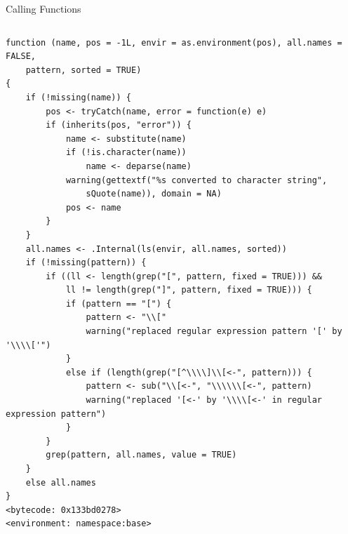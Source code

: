 \documentclass[
  11pt,
  ignorenonframetext,
]{beamer}
\begin{document}
\begin{frame}[fragile]{Calling Functions}
\begin{columns}[T,onlytextwidth]
\begin{column}{0.48\textwidth}
\begin{verbatim}
function (name, pos = -1L, envir = as.environment(pos), all.names = FALSE, 
    pattern, sorted = TRUE) 
{
    if (!missing(name)) {
        pos <- tryCatch(name, error = function(e) e)
        if (inherits(pos, "error")) {
            name <- substitute(name)
            if (!is.character(name)) 
                name <- deparse(name)
            warning(gettextf("%s converted to character string", 
                sQuote(name)), domain = NA)
            pos <- name
        }
    }
    all.names <- .Internal(ls(envir, all.names, sorted))
    if (!missing(pattern)) {
        if ((ll <- length(grep("[", pattern, fixed = TRUE))) && 
            ll != length(grep("]", pattern, fixed = TRUE))) {
            if (pattern == "[") {
                pattern <- "\\["
                warning("replaced regular expression pattern '[' by  '\\\\['")
            }
            else if (length(grep("[^\\\\]\\[<-", pattern))) {
                pattern <- sub("\\[<-", "\\\\\\[<-", pattern)
                warning("replaced '[<-' by '\\\\[<-' in regular expression pattern")
            }
        }
        grep(pattern, all.names, value = TRUE)
    }
    else all.names
}
<bytecode: 0x133bd0278>
<environment: namespace:base>
\end{verbatim}
\end{column}
\end{columns}
\end{frame}
\end{document}
